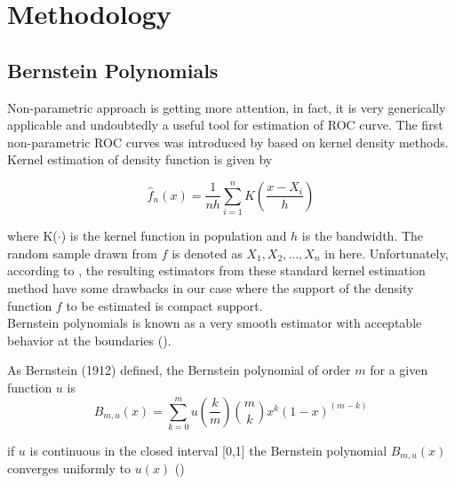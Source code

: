 

\chapter{Methodology} %

\label{Chapter3} %


\section{Bernstein Polynomials}

\quad \par Non-parametric approach is getting more attention, in fact, it is very generically applicable and undoubtedly a useful tool for estimation of ROC curve. The first non-parametric ROC curves was introduced by \cite{zou1997smooth} based on kernel density methods. Kernel estimation of density function is given by

\begin{equation}
    \hat{f}_n(x)=  \frac{1}{nh} \displaystyle\sum_{i=1}^{n} K\left(\frac{x-X_i}{h}\right)
\end{equation}

where K($\cdot$) is the kernel function in population and $h$ is the bandwidth. The random sample drawn from $f$ is denoted as $X_1, X_2, ..., X_n$ in here. Unfortunately, according to \cite{peng2004local}, the resulting estimators from these standard kernel estimation method have some drawbacks in our case where the support of the density function $f$ to be estimated is compact support.\\

Bernstein polynomials is known as a very smooth estimator with acceptable behavior at the boundaries (\cite{leblanc2010bias}).

As Bernstein (1912) defined, the Bernstein polynomial of order $m$ for a given function $u$ is
\begin{equation}
    B_{m,u}(x)= \displaystyle\sum_{k=0}^{m}u\left(\frac{k}{m}\right) \binom{m}{k} x^k(1-x)^{(m-k)}
\end{equation}

 if $u$ is continuous in the closed interval [0,1] the Bernstein polynomial $B_{m,u}(x)$ converges uniformly to $u(x)$ (\cite{bernstein1912demo})


